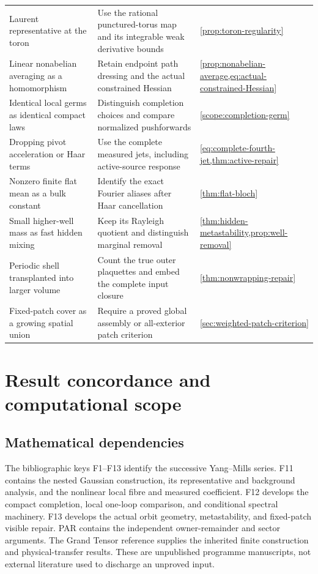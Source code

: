 \documentclass[11pt,oneside,openany]{book}
\theoremstyle{definition}
\theoremstyle{remark}
\begin{document}
\begin{longtable}{L{0.24\textwidth}L{0.49\textwidth}L{0.17\textwidth}}
Laurent representative at the toron & Use the rational punctured-torus map and its integrable weak derivative bounds & \cref{prop:toron-regularity} \\
Linear nonabelian averaging as a homomorphism & Retain endpoint path dressing and the actual constrained Hessian & \cref{prop:nonabelian-average,eq:actual-constrained-Hessian} \\
Identical local germs as identical compact laws & Distinguish completion choices and compare normalized pushforwards & \cref{scope:completion-germ} \\
Dropping pivot acceleration or Haar terms & Use the complete measured jets, including active-source response & \cref{eq:complete-fourth-jet,thm:active-repair} \\
Nonzero finite flat mean as a bulk constant & Identify the exact Fourier aliases after Haar cancellation & \cref{thm:flat-bloch} \\
Small higher-well mass as fast hidden mixing & Keep its Rayleigh quotient and distinguish marginal removal & \cref{thm:hidden-metastability,prop:well-removal} \\
Periodic shell transplanted into larger volume & Count the true outer plaquettes and embed the complete input closure & \cref{thm:nonwrapping-repair} \\
Fixed-patch cover as a growing spatial union & Require a proved global assembly or all-exterior patch criterion & \cref{sec:weighted-patch-criterion} \\
\bottomrule
\end{longtable}

\chapter{Result concordance and computational scope}
\label{app:concordance}
\section{Mathematical dependencies}
The bibliographic keys F1--F13 identify the successive Yang--Mills
series. F11 contains the nested Gaussian construction, its representative
and background analysis, and the nonlinear local fibre and measured
coefficient. F12 develops the compact completion, local one-loop
comparison, and conditional spectral machinery. F13 develops the
actual orbit geometry, metastability, and fixed-patch visible repair. PAR contains the independent owner-remainder
and sector arguments. The Grand Tensor reference supplies the inherited
finite construction and physical-transfer results. These are unpublished
programme manuscripts, not external literature used to discharge an
unproved input.
\end{document}
